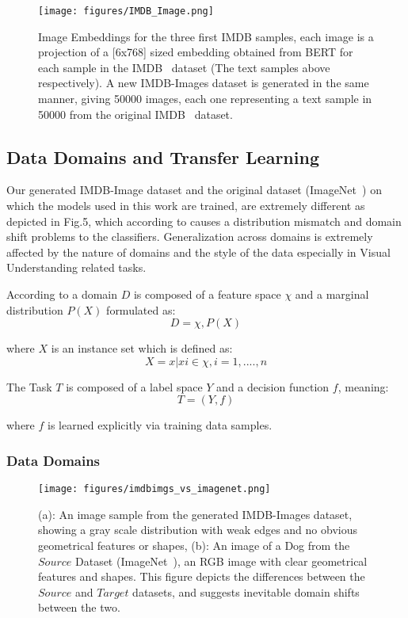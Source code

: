 \documentclass[conference]{IEEEtran}
\begin{document}
				\begin{figure}[htbp]
                \centerline{\texttt{[image: figures/IMDB\_Image.png]}}
                \caption{Image Embeddings for the three first IMDB samples, each image is a projection of a [6x768] sized embedding obtained from BERT for each sample in the IMDB~\cite{imdb} dataset (The text samples above respectively). A new IMDB-Images dataset is generated in the same manner, giving 50000 images, each one representing a text sample in 50000 from the original IMDB~\cite{imdb} dataset.}
                \label{figure-2-1}
                \end{figure}

\subsection{Data Domains and Transfer Learning}		
				Our generated IMDB-Image dataset and the original dataset (ImageNet~\cite{imagenet}) on which
			    the models used in this work are trained, are extremely different
			    as depicted in Fig.5, which according to \cite{domainshift} causes a 
			    distribution mismatch and domain shift problems to the classifiers. 
			    Generalization across domains is extremely affected by the nature of domains and the style of the data especially in Visual Understanding related tasks.
			    
			According to \cite{compsurvey} a domain $D$
			 is composed of a feature space $\chi$ and a marginal distribution
			$P(X)$ formulated as:
			\begin{equation}
			    D = {\chi,P(X)} 
			\end{equation}
			      
			
				where $X$ is an instance set which is defined as:
				$$X={x|xi \in \chi, i=1,....,n}$$

			The Task $T$ is composed of a label space $Y$ and a decision 
			function $f$, meaning:
			\begin{equation}
			    T = {(Y,f)}   
			\end{equation}
				
				where $f$ is learned explicitly via training data samples.
				
\subsubsection{Data Domains}

                \begin{figure}[htbp]
                \centerline{\texttt{[image: figures/imdbimgs\_vs\_imagenet.png]}}
                \caption{(a): An image sample from the generated IMDB-Images dataset, showing a gray scale distribution with weak edges and no obvious geometrical features or shapes, (b): An image of a Dog from the $Source$ Dataset (ImageNet~\cite{imagenet}), an RGB image with clear geometrical features and shapes. This figure depicts the differences between the $Source$ and $Target$ datasets, and suggests inevitable domain shifts between the two.}
                \label{figure-3-1}
                \end{figure}
                
\end{document}
